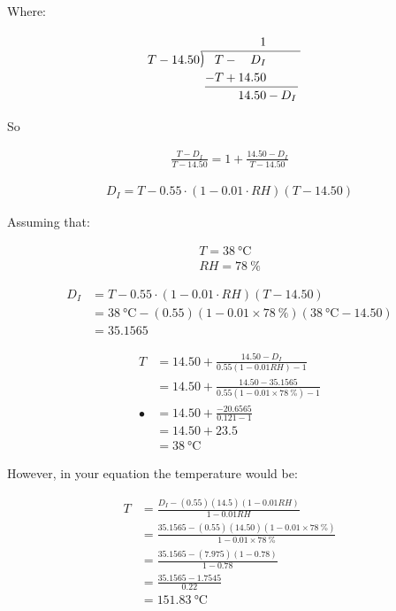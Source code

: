 \documentclass{article}
\newcommand{\longdiv}{\smash{\mkern-0.43mu\vstretch{1.31}{\hstretch{.7}{)}}\mkern-5.2mu\vstretch{1.31}{\hstretch{.7}{)}}}}
\begin{document}
Where:

\[
\arraycolsep=1pt
\renewcommand\arraystretch{1.2}
\begin{array}{*1r @{\hskip\arraycolsep}c@{\hskip\arraycolsep} *{11}r}
	&          &  &  & 1 &  &  &  &  &  &  &  & \\
	\cline{2-8}
	T-14.50 & \longdiv & T & -  & D_I  &   &      &   &      &   &      &   &        \\
	&          & -T & + & 14.50 &  &   &   &      &   &      &   &        \\
	\cline{3-7}
	&          &   &   & 14.50 & - &  D_I &   &      &   &      &   &        \\
\end{array}
\] 

So

\begin{align}
		\frac{T - D_I}{T - 14.50} = 1 + \frac{14.50 - D_I}{T-14.50} \nonumber
\end{align}

\begin{align}
	D_I = T - 0.55 \cdot (1 - 0.01 \cdot RH) (T - 14.50)
\end{align}

Assuming that:

\begin{align}
	T = \qty{38}{\degreeCelsius} \\
	RH = \qty{78}{\percent}
\end{align}

\begin{align}
	D_I &= T - 0.55 \cdot (1 - 0.01 \cdot RH) (T - 14.50) \\ 
	&= \qty{38}{\degreeCelsius} - (0.55)(1 - 0.01 \times \qty{78}{\percent} )(\qty{38}{\degreeCelsius} - 14.50) \\
	&= 35.1565
\end{align}

\begin{align}
	T &= 14.50 + \frac{14.50 - D_I}{0.55(1 - 0.01RH) - 1} \\
	&= 14.50 + \frac{14.50 - 35.1565}{0.55(1 - 0.01 \times \qty{78}{\percent} ) - 1} \\•
	&= 14.50 + \frac{-20.6565}{0.121-1} \\
	&= 14.50 + 23.5 \\
	&=\qty{38}{\degreeCelsius}
\end{align}

However, in your equation the temperature would be:

\begin{align}
	T &= \frac{D_I - (0.55)(14.5)(1 - 0.01RH)}{1 - 0.01RH} \\
	 &= \frac{35.1565 - (0.55)(14.50)(1 - 0.01 \times \qty{78}{\percent})}{1 - 0.01 \times \qty{78}{\percent}} \\
	 &= \frac{35.1565 - (7.975)(1 - 0.78)}{1 - 0.78} \\
	 &= \frac{35.1565 - 1.7545}{0.22} \\
	 &= \qty{151.83}{\degreeCelsius}
\end{align}
\end{document}
